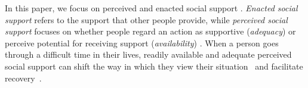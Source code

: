 In this paper, we focus on perceived and enacted social support \cite{barrera1981preliminary, gottlieb1983social, heller1983social}. \emph{Enacted social support} refers to the support that other people provide, while \emph{perceived social support} focuses on whether people regard an action as supportive (\emph{adequacy}) or perceive potential for receiving support (\emph{availability}) \cite{cohen1983positive,holahan1981social}.  When a person goes through a difficult time in their lives, readily available and adequate perceived social support can shift the way in which they view their situation~\cite{barrera1986distinctions} and facilitate recovery~\cite{albrecht1987communicating}.








